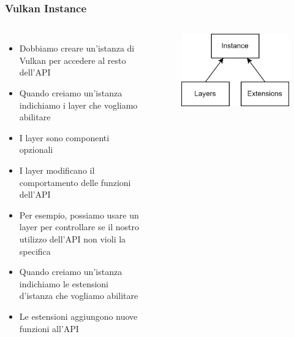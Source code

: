 \begin{frame}
\frametitle{Vulkan Instance}
\begin{columns}


\begin{itemize}
\item Dobbiamo creare un'istanza di Vulkan per accedere al resto dell'API
\item Quando creiamo un'istanza indichiamo i layer che vogliamo abilitare
\item I layer sono componenti opzionali
\item I layer modificano il comportamento delle funzioni dell'API
\item Per esempio, possiamo usare un layer per controllare se il nostro utilizzo dell'API non violi la specifica
\item Quando creiamo un'istanza indichiamo le estensioni d'istanza che vogliamo abilitare
\item Le estensioni aggiungono nuove funzioni all'API
\end{itemize}


\begin{figure}[ht]
    \centering
    \includegraphics[scale=0.2]{images/SlidesInitializingVulkan/Instance.png}
\end{figure}

\end{columns}
\end{frame}
